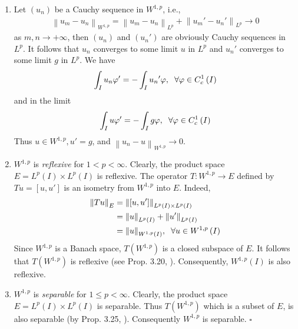 \documentclass[a4paper,oneside]{book}
\numberwithin{equation}{chapter}
\begin{document}
\begin{enumerate}
\item Let $\left(u_n\right)$ be a Cauchy sequence in $W^{1,p}$, i.e., 
\begin{align}
{\left\| {{u_m} - {u_n}} \right\|_{{W^{1,p}}}} = {\left\| {{u_m} - {u_n}} \right\|_{{L^p}}} + {\left\| {{u_m}' - {u_n}'} \right\|_{{L^p}}} \to 0 
\end{align}
as $m,n \to  + \infty$, then $\left(u_n\right)$ and $\left(u_n'\right)$ are obviously Cauchy sequences in $L^p$. It follows that $u_n$ converges to some limit $u$ in $L^p$ and $u_n'$ converges to some limit $g$ in $L^p$. We have
\begin{align}
\int_I {{u_n}\varphi '}  =  - \int_I {{u_n}'\varphi } ,\hspace{0.2cm}\forall \varphi  \in C_c^1\left( I \right)
\end{align}
and in the limit
\begin{align}
\int_I {u\varphi '}  =  - \int_I {g\varphi } ,\hspace{0.2cm}\forall \varphi  \in C_c^1\left( I \right)
\end{align}
Thus $u\in W^{1,p},u'=g$, and ${\left\| {{u_n} - u} \right\|_{{W^{1,p}}}} \to 0$.
\item $W^{1,p}$ is \textit{reflexive} for $1<p<\infty$. Clearly, the product space $E = {L^p}\left( I \right) \times {L^p}\left( I \right)$ is reflexive. The operator $T:W^{1,p}\to E$ defined by $Tu = \left[ {u,u'} \right]$ is an isometry from $W^{1,p}$ into $E$. Indeed,
\begin{align}
{\left\| {Tu} \right\|_E} &= {\left\| {\left[ {u,u'} \right]} \right\|_{{L^p}\left( I \right) \times {L^p}\left( I \right)}}\\
 &= {\left\| u \right\|_{{L^p}\left( I \right)}} + {\left\| {u'} \right\|_{{L^p}\left( I \right)}}\\
 &= {\left\| u \right\|_{{W^{1,p}}\left( I \right)}},\hspace{0.2cm}\forall u \in {W^{1,p}}\left( I \right)
\end{align}
Since $W^{1,p}$ is a Banach space, $T\left( {{W^{1,p}}} \right)$ is a closed subspace of $E$. It follows that $T\left( {{W^{1,p}}} \right)$ is reflexive (see Prop. 3.20, \cite{1}). Consequently, ${W^{1,p}}\left( I \right)$ is also reflexive.
\item $W^{1,p}$ is \textit{separable} for $1\le p<\infty$. Clearly, the product space $E = {L^p}\left( I \right) \times {L^p}\left( I \right)$ is separable. Thus $T\left( {{W^{1,p}}} \right)$ which is a subset of $E$, is also separable (by Prop. 3.25, \cite{1}). Consequently $W^{1,p}$ is separable. \hfill $\square$
\end{enumerate}
\end{document}

